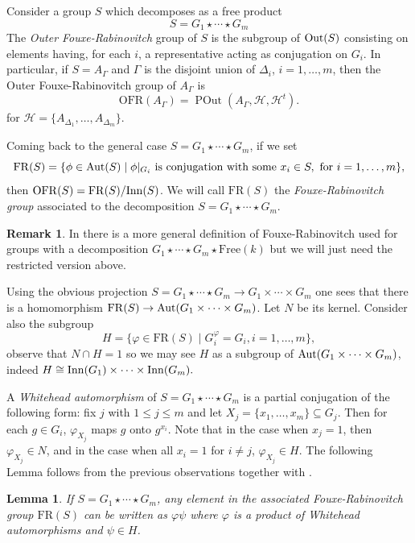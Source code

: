 \documentclass[10pt]{amsart}
\newtheorem{lemma}[theorem]{Lemma}
\theoremstyle{definition}
\newtheorem{remark}[theorem]{Remark}
\newcommand{\Out}{{\rm Out}}
\newcommand{\Inn}{{\rm Inn}}
\newcommand{\Aut}{{\rm Aut}}
\newcommand{\POut}{\operatorname {POut}}
\theoremstyle{definition}
\numberwithin{equation}{section}
\begin{document}
Consider a group $S$ which decomposes as a free product
\[S=G_1\star\cdots\star G_m\]
 The {\sl Outer Fouxe-Rabinovitch} group of $S$ is the subgroup of $\Out(S)$ consisting on elements having, for each $i$, a representative acting as conjugation on $G_i$. In particular, if $S=A_\Gamma$ and $\Gamma$ is the disjoint union of $\Delta_i$, $i=1,\ldots,m$, then the Outer Fouxe-Rabinovitch group of $A_\Gamma$ is
 \[\mathrm{OFR}(A_\Gamma)=\POut(A_\Gamma, \mathcal{H}, \mathcal{H}^t).\]
 for $\mathcal{H} = \{A_{\Delta_1},\ldots,A_{\Delta_m}\}$.

Coming back to the general case $S=G_1\star\cdots\star G_m$, if we set
  \[\mathrm{FR}(S)=\{\phi\in\Aut(S)\mid \phi|_{G_i} \text{ is conjugation with some } x_i \in S, \text{ for }  i = 1, \ldots, m\},\]
 then $\mathrm{OFR}(S)=\mathrm{FR}(S)/\Inn(S)$. We will call $\mathrm{FR}(S)$ the {\sl Fouxe-Rabinovitch group} associated to the decomposition $S=G_1\star\cdots\star G_m$.
 
  \begin{remark} In \cite{DayWade} there is a more general definition of Fouxe-Rabinovitch used for groups with a decomposition   $G_1\star\cdots\star G_m\star\mathrm{Free}(k)$ but we will just need the restricted version above.
  \end{remark}
  
 Using the obvious projection $S=G_1\star\cdots\star G_m\to G_1\times\cdots\times G_m$ one sees that there is a homomorphism $\mathrm{FR}(S)\to\Aut(G_1\times\cdots\times G_m)$. Let $N$ be its kernel. 
  Consider also the subgroup
   \[H=\{\varphi\in\mathrm{FR}(S)\mid G_i^\varphi=G_i, i=1,\ldots,m\},\]
  observe that $N\cap H=1$ so we may see $H$ as a subgroup of $\Aut(G_1\times\cdots\times G_m)$, indeed
  $H\cong\Inn(G_1)\times\cdots\times\Inn(G_m).$
  
   A {\sl Whitehead automorphism} of $S=G_1\star\cdots\star G_m$ is a partial conjugation of the following form: fix  $j$ with $1\leq j\leq m$ and let $X_j=\{x_1,\ldots,x_m\}\subseteq G_j$. Then for each $g\in G_i$, $\varphi_{X_j}$ maps $g$ onto $g^{x_i}$. Note that in the case when $x_j=1$, then $\varphi_{X_j}\in N$, and in the case when all $x_i=1$ for $i\neq j$, $\varphi_{X_j}\in H$. The following Lemma follows from the previous observations together with \cite[Lemma 2.1]{McCulloughMiller}.
   
    \begin{lemma}\label{FRdecomposition} If $S=G_1\star\cdots\star G_m$, any element in the associated Fouxe-Rabinovitch group $\mathrm{FR}(S)$ can be written as $\varphi\psi$ where $\varphi$ is a product of Whitehead automorphisms and $\psi\in H$.
\end{lemma} 
\end{document}
